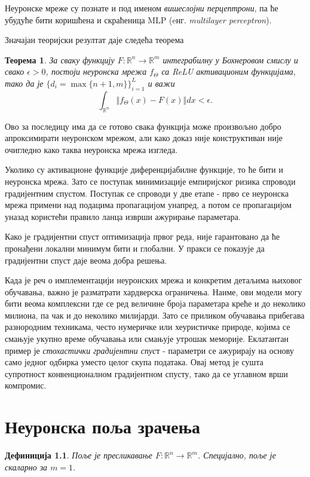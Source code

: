 \documentclass[12pt, a4paper, twoside]{book}
\numberwithin{equation}{chapter}
\newtheorem{theorem}{Теорема}
\numberwithin{theorem}{section}
\numberwithin{definition}{section}
\newtheorem{definitionChapter}{Дефиниција}
\numberwithin{definitionChapter}{chapter}
\begin{document}
Неуронске мреже су познате и под именом \textit{вишеслојни перцептрони}, па ће убудуће бити
коришћена и скраћеница MLP (eнг. \textit{multilayer perceptron}).

Значајан теоријски резултат даје следећа теорема \cite{universal-approx}
\begin{theorem}
	За сваку функцију $F:\mathbb{R}^n \rightarrow \mathbb{R}^m$ интеграбилну у Бохнеровом смислу
	и свако $\epsilon > 0$, постоји неуронска мрежа $f_\Theta$ са ReLU активационим функцијама,
	тако да је $\{d_i=\max\{ n + 1, m\}\}_{i=1}^{L}$ и важи
	$$\int_{\mathbb{R}^n}\left\Vert f_\Theta(x) - F(x) \right\Vert dx < \epsilon.$$
\end{theorem}
Ово за последицу има да се готово свака функција може произвољно добро апроксимирати неуронском
мрежом, али како доказ није конструктиван није очигледно како таква неуронска мрежа изгледа.

Уколико су активационе функције диференцијабилне функције, то ће бити и неуронска мрежа. Зато се
поступак минимизације емпиријског ризика спроводи градијентним спустом. Поступак се спроводи у
две етапе - прво се неуронска мрежа примени над подацима пропагацијом унапред, а потом се
пропагацијом уназад користећи правило ланца изврши ажурирање параметара.

Како је градијентни спуст
оптимизација првог реда, није гарантовано да ће пронађени локални минимум бити и глобални. У пракси
се показује да градијентни спуст даје веома добра решења.

Када је реч о имплементацији неуронских мрежа и конкретим детаљима њиховог обучавања, важно је
разматрати хардверска ограничења. Наиме, ови модели могу бити веома комплексни где се ред величине
броја параметара креће и до неколико милиона, па чак и до неколико милијарди. Зато се приликом
обучавања прибегава разнородним техникама, често нумеричке или хеуристичке природе, којима се
смањује укупно време обучавања или смањује утрошак меморије. Еклатантан пример је \textit{стохастички
градијентни спус}т \cite{sgd} - параметри се ажурирају на основу само једног одбирка уместо целог
скупа података. Овај метод је сушта супротност конвенционалном градијентном спусту, тако да се
углавном врши компромис.

\chapter{Неуронска поља зрачења}	
	\begin{definitionChapter}
		Поље је пресликавање $F:\mathbb{R}^n \rightarrow \mathbb{R}^m$. Специјално, поље је скаларно
		за $m=1$.
	\end{definitionChapter}
\end{document}
